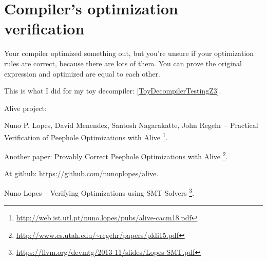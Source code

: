 \section{Compiler's optimization verification}

Your compiler optimized something out, but you're unsure if your optimization rules are correct, because there are lots of them.
You can prove the original expression and optimized are equal to each other.

This is what I did for my toy decompiler: \ref{ToyDecompilerTestingZ3}.

Alive project:

Nuno P. Lopes, David Menendez, Santosh Nagarakatte, John Regehr -- Practical Verification of Peephole Optimizations with Alive
\footnote{\url{http://web.ist.utl.pt/nuno.lopes/pubs/alive-cacm18.pdf}}.

Another paper: Provably Correct Peephole Optimizations with Alive
\footnote{\url{http://www.cs.utah.edu/~regehr/papers/pldi15.pdf}}.

At github: \url{https://github.com/nunoplopes/alive}.

Nuno Lopes -- Verifying Optimizations using SMT Solvers
\footnote{\url{https://llvm.org/devmtg/2013-11/slides/Lopes-SMT.pdf}}.

